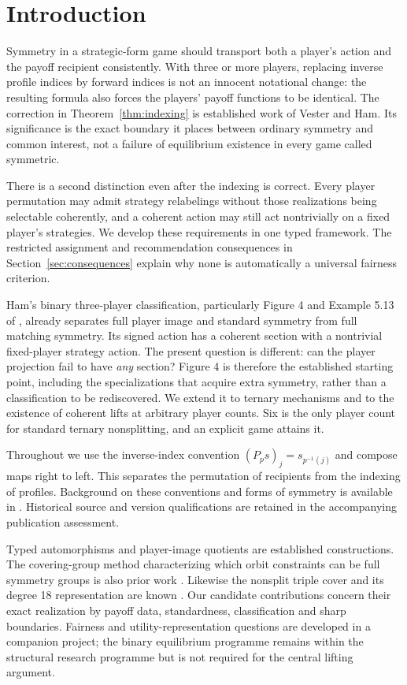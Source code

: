 \section{Introduction}\label{sec:01-introduction}
Symmetry in a strategic-form game should transport both a player's action
and the payoff recipient consistently. With three or more players, replacing
inverse profile indices by forward indices is not an innocent notational
change: the resulting formula also forces the players' payoff functions to
be identical. The correction in Theorem~\ref{thm:indexing} is established
work of Vester and Ham. Its significance is the exact boundary it places
between ordinary symmetry and common interest, not a failure of equilibrium
existence in every game called symmetric.

There is a second distinction even after the indexing is correct. Every
player permutation may admit strategy relabelings without those realizations
being selectable coherently, and a coherent action may still act nontrivially
on a fixed player's strategies. We develop these requirements in one typed
framework. The restricted assignment and recommendation consequences in
Section~\ref{sec:consequences} explain why none is automatically a universal
fairness criterion.

Ham's binary three-player classification, particularly Figure 4 and
Example 5.13 of \citet{ham2021}, already separates full player image and standard
symmetry from full matching symmetry. Its signed action has a coherent
section with a nontrivial fixed-player strategy action. The present question
is different: can the player projection fail to have \emph{any} section?
Figure 4 is therefore the established starting point, including the
specializations that acquire extra symmetry, rather than a classification
to be rediscovered. We extend it to ternary mechanisms and to the existence
of coherent lifts at arbitrary player counts. Six is the only player count
for standard ternary nonsplitting, and an explicit game attains it.

Throughout we use the inverse-index convention
$(P_p s)_j=s_{p^{-1}(j)}$ and compose maps right to left. This separates the
permutation of recipients from the indexing of profiles. Background on these
conventions and forms of symmetry is available in
\citet{ham2021,vester2012,plan2017,plan2023}. Historical source and version
qualifications are retained in the accompanying publication assessment.

Typed automorphisms and player-image quotients are established constructions.
The covering-group method characterizing which orbit constraints can be full
symmetry groups is also prior work \citep{cao2024}. Likewise the nonsplit
triple cover and its degree 18 representation are known
\citep{gillespie2018,atlas}. Our candidate contributions concern their exact
realization by payoff data, standardness, classification and sharp boundaries.
Fairness and utility-representation questions are developed in a companion
project; the binary equilibrium programme remains within the structural
research programme but is not required for the central lifting argument.

